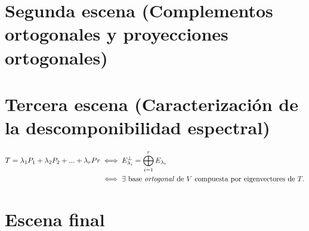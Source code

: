 \documentclass[12pt,dvipsnames]{article}
\numberwithin{equation}{section}
\begin{document}

\newpage
\section{Segunda escena (Complementos ortogonales y proyecciones ortogonales)}




\newpage
\section{Tercera escena (Caracterización de la descomponibilidad espectral)}

\begin{align*}
    T = \lambda_1P_1 + \lambda_2P_2 + ... + \lambda_rPr &\iff E_{\lambda_i}^\perp = \bigoplus_{i=1}^r E_{\lambda_i} \\
                                                        &\iff \exists \text{ base \emph{ortogonal} de } V \text{ compuesta por eigenvectores de } T.
\end{align*}


\newpage
\section{Escena final}
\end{document}
